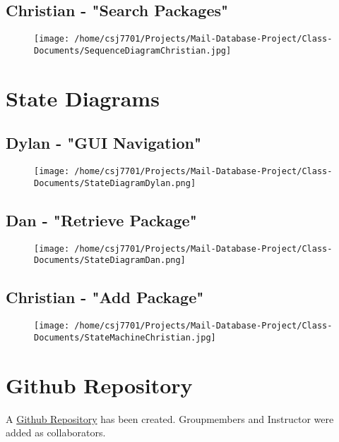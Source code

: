 \documentclass[11pt]{article}
\begin{document}
\subsection*{Christian - "Search Packages"}
\label{sec:orgdbf6fbf}
\begin{figure}[htbp]
\centering
\texttt{[image: /home/csj7701/Projects/Mail-Database-Project/Class-Documents/SequenceDiagramChristian.jpg]}
\bicaption{---}
\end{figure}
\newpage
\section*{State Diagrams}
\label{sec:orga36f8ac}

\subsection*{Dylan - "GUI Navigation"}
\label{sec:org92905d4}

\begin{figure}[htbp]
\centering
\texttt{[image: /home/csj7701/Projects/Mail-Database-Project/Class-Documents/StateDiagramDylan.png]}
\bicaption{---}
\end{figure}
\subsection*{Dan - "Retrieve Package"}
\label{sec:org57d582e}
\begin{figure}[htbp]
\centering
\texttt{[image: /home/csj7701/Projects/Mail-Database-Project/Class-Documents/StateDiagramDan.png]}
\bicaption{---}
\end{figure}
\newpage
\subsection*{Christian - "Add Package"}
\label{sec:orgc753fd4}
\begin{figure}[htbp]
\centering
\texttt{[image: /home/csj7701/Projects/Mail-Database-Project/Class-Documents/StateMachineChristian.jpg]}
\bicaption{---}
\end{figure}
\newpage

\section*{Github Repository}
\label{sec:org1e49bca}

A \href{https://github.com/CSJ7701/Mail-Database-Project}{Github Repository} has been created. Groupmembers and Instructor were added as collaborators.
\end{document}
